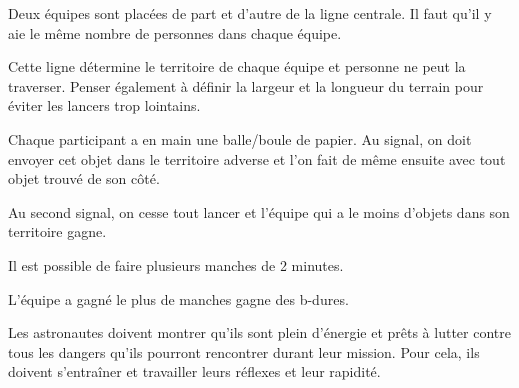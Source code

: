 \documentclass{grand-jeu}
\begin{document}
\begin{liste-materiel}
\end{liste-materiel}

\begin{regles}
Deux équipes sont placées de part et d’autre de la ligne centrale. Il faut qu'il y aie le même nombre de personnes dans chaque équipe. 

Cette ligne détermine le territoire de chaque équipe et personne ne peut la traverser. Penser également à définir la largeur et la longueur du terrain pour éviter les lancers trop lointains.

Chaque participant a en main une balle/boule de papier. Au signal, on doit envoyer cet objet dans le territoire adverse et l’on fait de même ensuite avec tout objet trouvé de son côté. 

Au second signal, on cesse tout lancer et l’équipe qui a le moins d’objets dans son territoire gagne.

Il est possible de faire plusieurs manches de 2 minutes.

L’équipe a gagné le plus de manches gagne des b-dures. 
\end{regles}

\begin{imaginaire}
Les astronautes doivent montrer qu'ils sont plein d'énergie et prêts à lutter contre tous les dangers qu'ils pourront rencontrer durant leur mission. Pour cela, ils doivent s'entraîner et travailler leurs réflexes et leur rapidité.
\end{imaginaire}

\begin{moments-stop}
\end{moments-stop}
\end{document}
